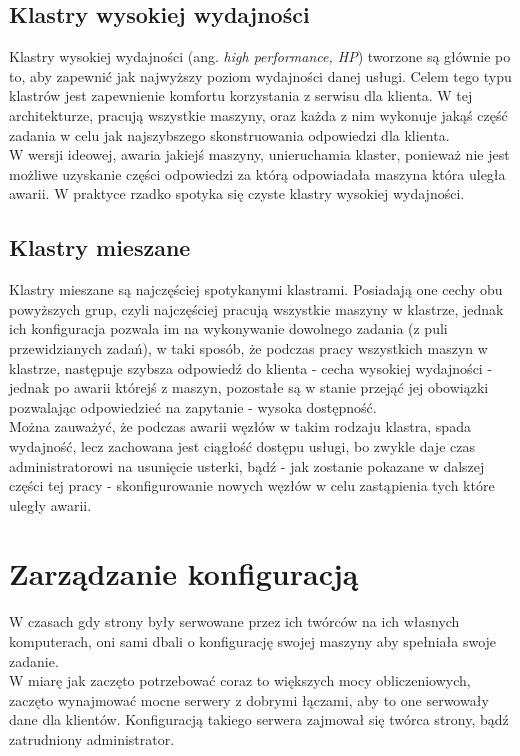 \subsection{Klastry wysokiej wydajności}
Klastry wysokiej wydajności (ang. \textit{high performance, HP}) tworzone są głównie po to, aby zapewnić jak najwyższy poziom wydajności danej usługi.
Celem tego typu klastrów jest zapewnienie komfortu korzystania z serwisu dla klienta. W tej architekturze, pracują wszystkie maszyny, oraz każda z nim wykonuje jakąś część zadania w celu jak najszybszego skonstruowania odpowiedzi dla klienta.\\
W wersji ideowej, awaria jakiejś maszyny, unieruchamia klaster, ponieważ nie jest możliwe uzyskanie części odpowiedzi za którą odpowiadała maszyna która uległa awarii. W praktyce rzadko spotyka się czyste klastry wysokiej wydajności.
\subsection{Klastry mieszane}
Klastry mieszane są najczęściej spotykanymi klastrami. Posiadają one cechy obu powyższych grup, czyli najczęściej pracują wszystkie maszyny w klastrze, jednak ich konfiguracja pozwala im na wykonywanie dowolnego zadania (z puli przewidzianych zadań), w taki sposób, że podczas pracy wszystkich maszyn w klastrze, następuje szybsza odpowiedź do klienta - cecha wysokiej wydajności - jednak po awarii którejś z maszyn, pozostałe są w stanie przejąć jej obowiązki pozwalając odpowiedzieć na zapytanie - wysoka dostępność.\\
Można zauważyć, że podczas awarii węzłów w takim rodzaju klastra, spada wydajność, lecz zachowana jest ciągłość dostępu usługi, bo zwykle daje czas administratorowi na usunięcie usterki, bądź - jak zostanie pokazane w dalszej części tej pracy - skonfigurowanie nowych węzłów w celu zastąpienia tych które uległy awarii.
\section{Zarządzanie konfiguracją}
W czasach gdy strony były serwowane przez ich twórców na ich własnych komputerach, oni sami dbali o konfigurację swojej maszyny aby spełniała swoje zadanie.\\
W miarę jak zaczęto potrzebować coraz to większych mocy obliczeniowych, zaczęto wynajmować mocne serwery z dobrymi łączami, aby to one serwowały dane dla klientów.
Konfiguracją takiego serwera zajmował się twórca strony, bądź zatrudniony administrator.

